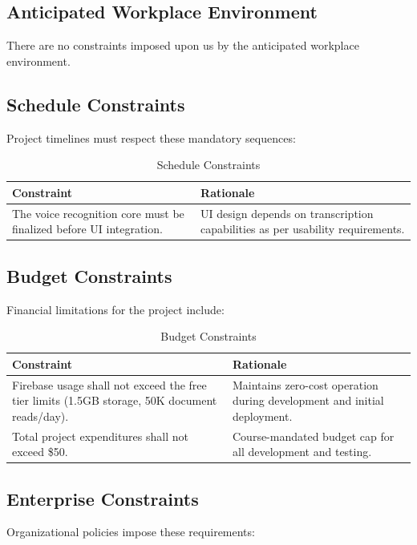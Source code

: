 \documentclass[12pt]{article}
\begin{document}
\subsection{Anticipated Workplace Environment}
There are no constraints imposed upon us by the anticipated workplace environment.

\subsection{Schedule Constraints}
Project timelines must respect these mandatory sequences:

\begin{table}[H]
\centering
\begin{tabular}{|p{6cm}|p{6cm}|}
\hline
\textbf{Constraint} & \textbf{Rationale} \\
\hline
The voice recognition core must be finalized before UI integration. & UI design depends on transcription capabilities as per usability requirements. \\
\hline
\end{tabular}
\caption{Schedule Constraints}
\label{tab:schedule_constraints}
\end{table}

\subsection{Budget Constraints}
Financial limitations for the project include:

\begin{table}[H]
\centering
\begin{tabular}{|p{6cm}|p{6cm}|}
\hline
\textbf{Constraint} & \textbf{Rationale} \\
\hline
Firebase usage shall not exceed the free tier limits (1.5GB storage, 50K document reads/day). & Maintains zero-cost operation during development and initial deployment. \\ 
\hline
Total project expenditures shall not exceed \$50. & Course-mandated budget cap for all development and testing. \\
\hline
\end{tabular}
\caption{Budget Constraints}
\label{tab:budget_constraints}
\end{table}

\subsection{Enterprise Constraints}
Organizational policies impose these requirements:
\end{document}
